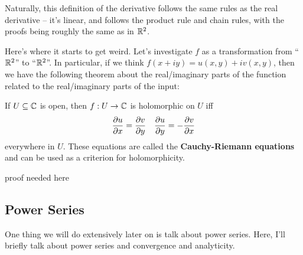 Naturally, this definition of the derivative follows the same rules as the real derivative -- it's linear, and follows the product rule and chain rules, with the proofs being roughly the same as in $\mathbb R^2$.

Here's where it starts to get weird. Let's investigate $f$ as a transformation from ``$\mathbb R^2$'' to ``$\mathbb R^2$''. In particular, if we think $f(x + iy) = u(x,y) + i v(x,y)$, then we have the following theorem about the real/imaginary parts of the function related to the real/imaginary parts of the input:
\begin{theorem}
  If $U \subseteq \mathbb C$ is open, then $f : U \to \mathbb C$ is holomorphic on $U$ iff \[ \frac{\partial u}{\partial x} = \frac{\partial v}{\partial y} \quad \frac{\partial u}{\partial y} = - \frac{\partial v}{\partial x}\] everywhere in $U$.
  These equations are called the \textbf{Cauchy-Riemann equations} and can be used as a criterion for holomorphicity.
\end{theorem}

proof needed here


\subsection{Power Series}
One thing we will do extensively later on is talk about power series. Here, I'll briefly talk about power series and convergence and analyticity.